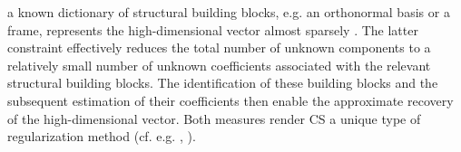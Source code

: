 a known dictionary of
structural building blocks, e.g.
an orthonormal basis or
a frame, represents
the high-dimensional vector almost sparsely
\cite{article:TroppPIEEE2010}.
The latter constraint effectively reduces
the total number of
unknown components to
a relatively small number of
unknown coefficients associated with
the relevant structural building blocks.
The identification of
these building blocks and
the subsequent estimation of
their coefficients then enable
the approximate recovery of
the high-dimensional vector.
Both measures render
\ac{CS} a unique type of
regularization method
(cf. e.g.
\cite[Chapt. 1]{book:Hansen2010},
\cite[Sect. 1.3]{book:Hansen1998}%
).

